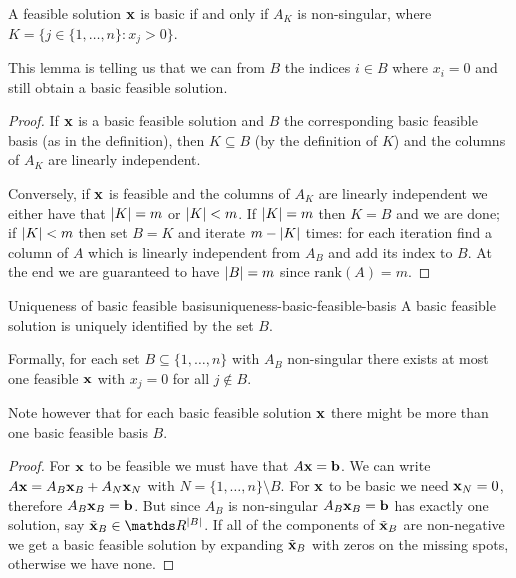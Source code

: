 \documentclass[12pt]{extarticle}
\renewcommand{\vec}[1]{\bvec{#1}}
\begin{document}
\begin{lemma}{}{}
	A feasible solution $\vec x$ is basic if and only if $A_K$ is non-singular, where
	$K = \{ j \in \{1, \dots, n\} : x_j > 0 \}$.
\end{lemma}

This lemma is telling us that we can  from $B$ the indices $i \in B$ where $x_i = 0$
and still obtain a basic feasible solution.

\begin{proof}
	If $\vec x$ is a basic feasible solution and $B$ the corresponding basic feasible basis (as in the
	definition), then $K \subseteq B$ (by the definition of $K$) and the columns of $A_K$ are linearly
	independent.

	Conversely, if $\vec x$ is feasible and the columns of $A_K$ are linearly independent we either
	have that $\abs{K} = m$ or $\abs{K} < m$.
	If $\abs{K} = m$ then $K = B$ and we are done; if $\abs{K} < m$ then set $B = K$ and
	iterate $m- \abs{K}$ times: for each iteration find a column of $A$ which is linearly independent
	from $A_B$ and add its index to $B$.
	At the end we are guaranteed to have $\abs{B} = m$ since $\mathrm{rank}(A) = m$.
\end{proof}

\begin{proposition}{Uniqueness of basic feasible basis}{uniqueness-basic-feasible-basis}
	A basic feasible solution is uniquely identified by the set $B$.

	Formally, for each set $B \subseteq \{1, \dots, n\}$ with $A_B$ non-singular
	there exists at most one feasible $\vec x$ with $x_j = 0$ for all $j \notin B$.
\end{proposition}

Note however that for each basic feasible solution $\vec x$ there might be more than one basic
feasible basis $B$.

\begin{proof}
	For $\vec x$ to be feasible we must have that $A \vec x = \vec b$.
	We can write $A \vec x = A_B \vec x_B + A_N \vec x_N$ with $N = \{1, \dots, n\} \setminus B$.
	For $\vec x$ to be basic we need $\vec x_N = 0$, therefore $A_B \vec x_B = \vec b$.
	But since $A_B$ is non-singular $A_B \vec x_B = \vec b$ has exactly one solution, say
	$\tilde{\vec x}_B \in \R^{\abs{B}}$.
	If all of the components of $\tilde{\vec x}_B$ are non-negative we get a basic feasible solution by
	expanding $\tilde{\vec x}_B$ with zeros on the missing spots, otherwise we have none.
\end{proof}
\end{document}
